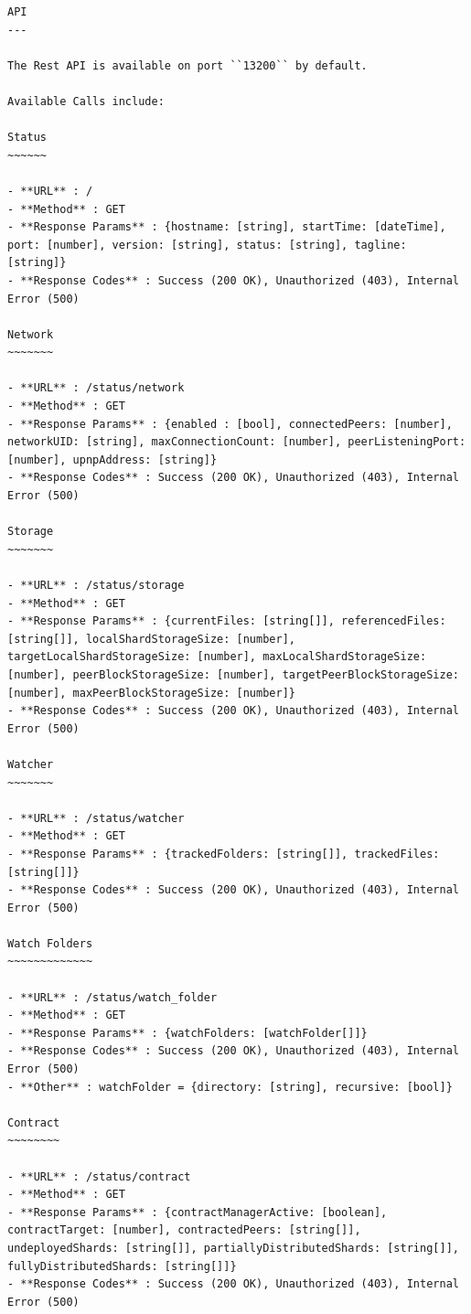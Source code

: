 \documentclass[11pt, a4paper, twocolumn, twoside]{report}
\begin{document}
\begin{lstlisting}[language=RsT, caption=Membrane API Documentation, label=lst:apiDocs]
API
---

The Rest API is available on port ``13200`` by default.

Available Calls include:

Status
~~~~~~

- **URL** : /
- **Method** : GET
- **Response Params** : {hostname: [string], startTime: [dateTime], port: [number], version: [string], status: [string], tagline: [string]}
- **Response Codes** : Success (200 OK), Unauthorized (403), Internal Error (500)

Network
~~~~~~~

- **URL** : /status/network
- **Method** : GET
- **Response Params** : {enabled : [bool], connectedPeers: [number], networkUID: [string], maxConnectionCount: [number], peerListeningPort: [number], upnpAddress: [string]}
- **Response Codes** : Success (200 OK), Unauthorized (403), Internal Error (500)

Storage
~~~~~~~

- **URL** : /status/storage
- **Method** : GET
- **Response Params** : {currentFiles: [string[]], referencedFiles: [string[]], localShardStorageSize: [number], targetLocalShardStorageSize: [number], maxLocalShardStorageSize: [number], peerBlockStorageSize: [number], targetPeerBlockStorageSize: [number], maxPeerBlockStorageSize: [number]}
- **Response Codes** : Success (200 OK), Unauthorized (403), Internal Error (500)

Watcher
~~~~~~~

- **URL** : /status/watcher
- **Method** : GET
- **Response Params** : {trackedFolders: [string[]], trackedFiles: [string[]]}
- **Response Codes** : Success (200 OK), Unauthorized (403), Internal Error (500)

Watch Folders
~~~~~~~~~~~~~

- **URL** : /status/watch_folder
- **Method** : GET
- **Response Params** : {watchFolders: [watchFolder[]]}
- **Response Codes** : Success (200 OK), Unauthorized (403), Internal Error (500)
- **Other** : watchFolder = {directory: [string], recursive: [bool]}

Contract
~~~~~~~~

- **URL** : /status/contract
- **Method** : GET
- **Response Params** : {contractManagerActive: [boolean], contractTarget: [number], contractedPeers: [string[]], undeployedShards: [string[]], partiallyDistributedShards: [string[]], fullyDistributedShards: [string[]]}
- **Response Codes** : Success (200 OK), Unauthorized (403), Internal Error (500)


\end{lstlisting}
\end{document}
